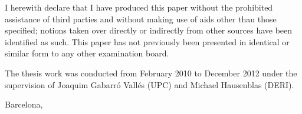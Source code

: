 


\begin{declaration}        %

I herewith declare that I have produced this paper without the prohibited assistance of third parties and without making use of aids other than those specified; notions taken over directly or indirectly from other sources have been identified as such. This paper has not previously been presented in identical or similar form to any other examination board.

The thesis work was conducted from February 2010 to December 2012 under the supervision of Joaquim Gabarró Vallés (UPC) and Michael Hausenblas (DERI).

\vspace{10mm}

Barcelona,


\end{declaration}


